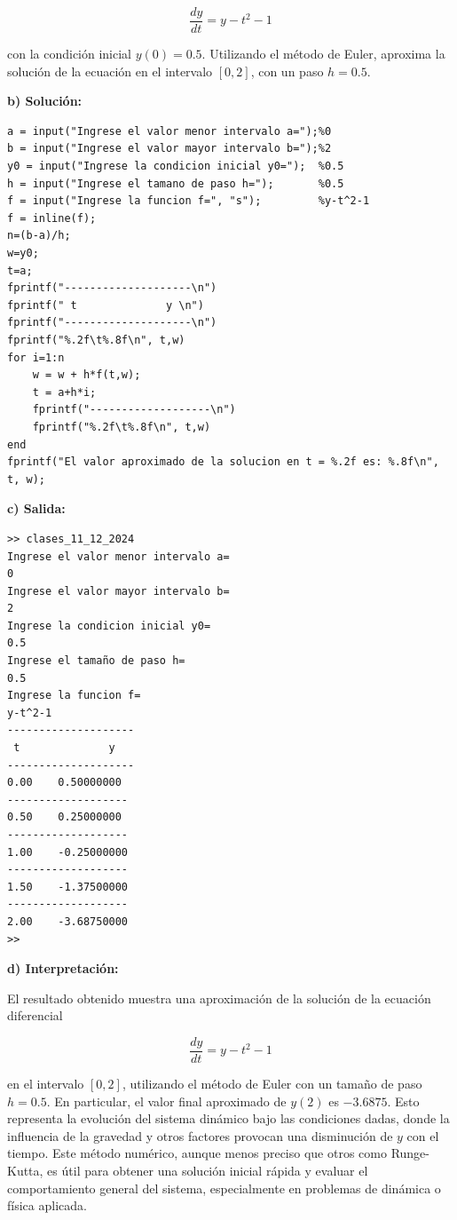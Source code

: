 \documentclass[12pt,a4paper,twoside]{article}  %
\begin{document}
\[
\frac{dy}{dt} = y - t^2 - 1
\]

con la condición inicial \( y(0) = 0.5 \). Utilizando el método de Euler, aproxima la solución de la ecuación en el intervalo \([0, 2]\), con un paso \( h = 0.5 \).

\textbf{b) Solución:}

\begin{lstlisting}
a = input("Ingrese el valor menor intervalo a=");%0
b = input("Ingrese el valor mayor intervalo b=");%2
y0 = input("Ingrese la condicion inicial y0=");  %0.5
h = input("Ingrese el tamano de paso h=");       %0.5
f = input("Ingrese la funcion f=", "s");         %y-t^2-1
f = inline(f);
n=(b-a)/h;
w=y0;
t=a;
fprintf("--------------------\n")
fprintf(" t              y \n")
fprintf("--------------------\n")
fprintf("%.2f\t%.8f\n", t,w)
for i=1:n
    w = w + h*f(t,w);
    t = a+h*i;
    fprintf("-------------------\n")
    fprintf("%.2f\t%.8f\n", t,w)
end
fprintf("El valor aproximado de la solucion en t = %.2f es: %.8f\n", t, w);

\end{lstlisting}

\textbf{c) Salida:}

\begin{verbatim}
>> clases_11_12_2024
Ingrese el valor menor intervalo a=
0
Ingrese el valor mayor intervalo b=
2
Ingrese la condicion inicial y0=
0.5
Ingrese el tamaño de paso h=
0.5
Ingrese la funcion f=
y-t^2-1
--------------------
 t              y 
--------------------
0.00	0.50000000
-------------------
0.50	0.25000000
-------------------
1.00	-0.25000000
-------------------
1.50	-1.37500000
-------------------
2.00	-3.68750000
>> 
\end{verbatim}

\textbf{d) Interpretación:}

El resultado obtenido muestra una aproximación de la solución de la ecuación diferencial 

\[
\frac{dy}{dt} = y - t^2 - 1
\]

en el intervalo \([0, 2]\), utilizando el método de Euler con un tamaño de paso \( h = 0.5 \). En particular, el valor final aproximado de \( y(2) \) es \(-3.6875\). Esto representa la evolución del sistema dinámico bajo las condiciones dadas, donde la influencia de la gravedad y otros factores provocan una disminución de \( y \) con el tiempo. Este método numérico, aunque menos preciso que otros como Runge-Kutta, es útil para obtener una solución inicial rápida y evaluar el comportamiento general del sistema, especialmente en problemas de dinámica o física aplicada.
\end{document}
